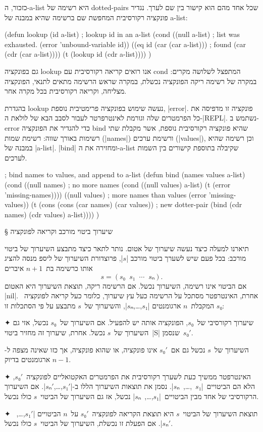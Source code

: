 \documentclass[a4paper,12pt,reqno]{article}
\begin{document}
כזכור, ה-a-list היא רשימה של dotted-pairs שכל אחד מהם הוא קישור בין שם לערך.
נגדיר פונקציה רקורסיבית המחפשת שם ברשימה שהיא במבנה של a-list:
\begin{LISP}
(defun lookup (id a-list) ; lookup id in an a-list
  (cond
    ((null a-list) ; list was exhausted.
      (error 'unbound-variable id))
    ((eq id (car (car a-list))) ; found
      (car (cdr (car a-list))))
    (t (lookup id (cdr a-list))))
)
\end{LISP}
גם בפונקציה lookup אנו רואים קריאה רקורסיבית עם cond המתפצל לשלושה מקרים: במקרה
של רשימה ריקה הפונקציה נכשלת, במקרה שראש הרשימה מתאים לתנאי, הפונקציה מצליחה,
וקריאה רקורסיבית בכל מקרה אחר.

בהגדרת lookup נעשה שימוש בפונקציה פרימטיבית נוספת, \E|error|. פונקציה זו מדפיסה את
כל הפרמטרים שלה וגורמת לאינטרפרטר לעבור לסבב הבא של לולאת ה-\E|REPL|.
נשתמש ב-error כדי להגדיר את הפונקציה bind שהיא פונקציה רקורסיבית נוספת,
אשר מקבלת שתי רשימות באורך שווה: רשימת שמות (\E|names|) ורשימת ערכים
(\E|values|), וכן רשימה שהיא במבנה של \E|a-list|. \E|bind| ומחזירה את ה-a-list
שקיבלה בתוספת קישורים בין השמות לערכים.
\begin{LISP}
; bind names to values, and append to a-list
(defun bind (names values a-list)
  (cond
    ((null names) ; no more names
      (cond
        ((null values) a-list)
        (t (error 'missing-names))))
    ((null values) ; more names than values
      (error 'missing-values))
    (t
      (cons
        (cons (car names) (car values)) ; new dotter-pair
        (bind (cdr names) (cdr values) a-list))))
)
\end{LISP}

§ שיערוך ביטוי מורכב וקריאה לפונקציה

תיארנו למעלה כיצד נעשה שיערוך של אטום. נותר לתאר כיצד מתבצע השיערוך של ביטוי
מורכב: בכל פעם שיש לשערך ביטוי מורכב \E|$s$|, פרוצדורת השיערוך של ליספ מנסה
להציג אותו כרשימה בת~$n+1$ איברים \[
  s=(s₀\;\;s₁\;\;⋯\;\;sₙ).
\] אם הביטוי אינו רשימה, השיערוך נכשל. אם הרשימה ריקה, תוצאת השיערוך היא האטום
\T|nil|. אחרת, האינטרפטר מסתכל על הרשימה כעל עץ שיערוך, כלומר כעל קריאה
לפונקציה~$s₀$ המקבלת~$n$ ארגומנטים \E|$s₁$,…,$sₙ$|, והשיערוך
של~$s$ מתבצע על פי הסתכלות זו:
\begin{enumerate}
  ✦ שיערוך רקורסיבי של~$s₀$, הפונקציה אותה יש להפעיל. אם השיערוך של~$s₀$ נכשל,
  אזי גם השיערוך של~$s$ נכשל. אחרת, שיערוך זה מחזיר ביטוי~\E|S| שנסמן~$s₀'$.

  השיערוך של~$s$ נכשל גם אם~$s₀'$ אינו פונקציה, או שהוא פונקציה, אך כזו שאינה
  מצפה ל-$n-1$ ארגומנטים בדיוק.

  ✦ האינטרפטר ממשיך כעת לשערך רקורסיבית את הפרמטרים האקטואליים לפונקציה~$s₀'$,
  הלא הם הביטויים~\E|$s₁$~,…,~$sₙ$|. נסמן את תוצאות השיערוך הללו
  ב-\E|$s₁'$,…,$sₙ'$|.  אם השיערוך הרקורסיבי של אחד מבין
  הביטויים~\E|$s₁$,…,~$sₙ$| נכשל, אז גם השיערוך של הביטוי~$s$
  כולו נכשל.

  ✦ תוצאת השיערוך של הביטוי~$s$ היא תוצאת הקריאה לפונקציה~$s₀'$ על~$n$ הביטויים
  \E|$s₁'$,…,~$sₙ'$|. אם הפעלת זו נכשלת, השיערוך של הביטוי~$s$ כולו נכשל.
\end{enumerate}
\end{document}
